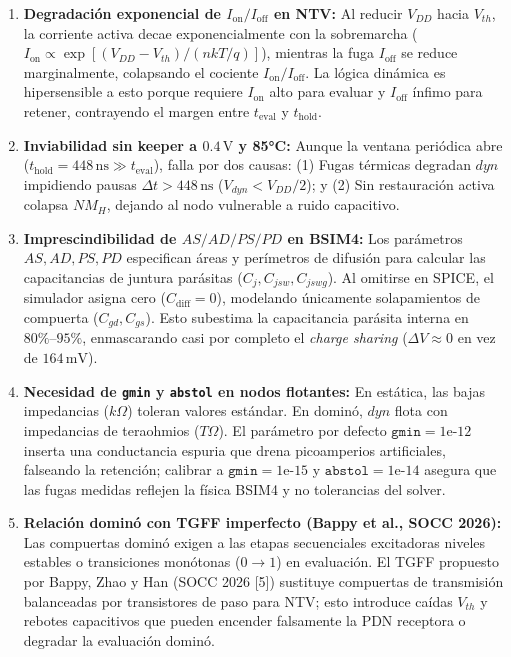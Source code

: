 \begin{enumerate}[leftmargin=1.5em,itemsep=0.04em,parsep=0pt,topsep=0.1em]
\item \textbf{Degradación exponencial de $I_{\text{on}}/I_{\text{off}}$ en NTV:} Al reducir $V_{DD}$ hacia $V_{th}$, la corriente activa decae exponencialmente con la sobremarcha ($I_{\text{on}} \propto \exp[(V_{DD}-V_{th})/(n k T/q)]$), mientras la fuga $I_{\text{off}}$ se reduce marginalmente, colapsando el cociente $I_{\text{on}}/I_{\text{off}}$. La lógica dinámica es hipersensible a esto porque requiere $I_{\text{on}}$ alto para evaluar y $I_{\text{off}}$ ínfimo para retener, contrayendo el margen entre $t_{\text{eval}}$ y $t_{\text{hold}}$.

\item \textbf{Inviabilidad sin keeper a $0.4\,\text{V}$ y 85°C:} Aunque la ventana periódica abre ($t_{\text{hold}}=448\,\text{ns} \gg t_{\text{eval}}$), falla por dos causas: (1) Fugas térmicas degradan $dyn$ impidiendo pausas $\Delta t > 448\,\text{ns}$ ($V_{dyn} < V_{DD}/2$); y (2) Sin restauración activa colapsa $NM_H$, dejando al nodo vulnerable a ruido capacitivo.

\item \textbf{Imprescindibilidad de $AS/AD/PS/PD$ en BSIM4:} Los parámetros $AS, AD, PS, PD$ especifican áreas y perímetros de difusión para calcular las capacitancias de juntura parásitas ($C_j, C_{jsw}, C_{jswg}$). Al omitirse en SPICE, el simulador asigna cero ($C_{\text{diff}}=0$), modelando únicamente solapamientos de compuerta ($C_{gd}, C_{gs}$). Esto subestima la capacitancia parásita interna en $80\%\text{--}95\%$, enmascarando casi por completo el \textit{charge sharing} ($\Delta V \approx 0$ en vez de $164\,\text{mV}$).

\item \textbf{Necesidad de \texttt{gmin} y \texttt{abstol} en nodos flotantes:} En estática, las bajas impedancias ($k\Omega$) toleran valores estándar. En dominó, $dyn$ flota con impedancias de teraohmios ($T\Omega$). El parámetro por defecto $\texttt{gmin}=1\text{e-}12$ inserta una conductancia espuria que drena picoamperios artificiales, falseando la retención; calibrar a $\texttt{gmin}=1\text{e-}15$ y $\texttt{abstol}=1\text{e-}14$ asegura que las fugas medidas reflejen la física BSIM4 y no tolerancias del solver.

\item \textbf{Relación dominó con TGFF imperfecto (Bappy et al., SOCC 2026):} Las compuertas dominó exigen a las etapas secuenciales excitadoras niveles estables o transiciones monótonas ($0 \to 1$) en evaluación. El TGFF propuesto por Bappy, Zhao y Han (SOCC 2026 [5]) sustituye compuertas de transmisión balanceadas por transistores de paso para NTV; esto introduce caídas $V_{th}$ y rebotes capacitivos que pueden encender falsamente la PDN receptora o degradar la evaluación dominó.


\end{enumerate}
